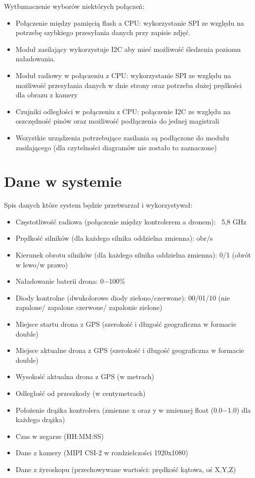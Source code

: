 \documentclass[12pt]{article}
\begin{document}
Wytłumaczenie wyborów niektórych połączeń:
\begin{itemize}
    \item Połączenie między pamięcią flash a CPU: wykorzystanie SPI ze względu na potrzebę szybkiego przesyłania danych przy zapisie zdjęć.
    \item Moduł zasilający wykorzystuje I2C aby mieć możliwość śledzenia poziomu naładowania.
    \item Moduł radiowy w połączeniu z CPU: wykorzystanie SPI ze względu na możliwość przesyłania danych w dnie strony oraz potrzeba dużej prędkości dla obrazu z kamery
    \item Czujniki odległości w połączeniu z CPU: połączenie I2C ze względu na oszczędność pinów oraz możliwość podłączenia do jednej magistrali
    \item Wszystkie urządzenia potrzebujące zasilania są podłączone do modułu zasilającego (dla czytelności diagramów nie zostało to zaznaczone)
\end{itemize}


\section{Dane w systemie}

Spis danych które system będzie przetwarzał i wykorzystywał:
\begin{itemize}
    \item Częstotliwość radiowa (połączenie między kontrolerem a dronem): ~5,8 GHz
    \item Prędkość silników (dla każdego silnika oddzielna zmienna): obr$/$s
    \item Kierunek obrotu silników (dla każdego silnika oddzielna zmienna): 0/1 (obrót w lewo/w prawo)
    \item Naładowanie baterii drona: 0$-$100\% 
    \item Diody kontrolne (dwukolorowe diody zielono/czerwone): 00/01/10 (nie zapalone/ zapalone czerwone/ zapalonie zielone)
    \item Miejsce startu drona z GPS (szerokość i długość geograficzna w formacie double)
    \item Miejsce aktualne drona z GPS (szerokość i długość geograficzna w formacie double)
    \item Wysokość aktualna drona z GPS (w metrach)
    \item Odległość od przeszkody (w centymetrach)
    \item Położenie drążka kontrolera (zmienne x oraz y w zmiennej float (0.0$-$1.0) dla każdego drążka)
    \item Czas w zegarze (HH:MM:SS)
    \item Dane z kamery (MIPI CSI-2 w rozdzielczości 1920x1080)
    \item Dane z żyroskopu (przechowywane wartości: prędkość kątowa, oś X,Y,Z)
\end{itemize}
\end{document}

